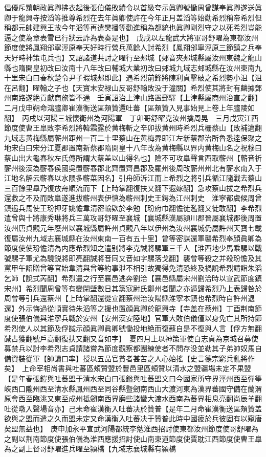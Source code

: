 倡優斥黷朝政眞卿拂衣起後張伯儀敗績令以首級夸示眞卿號慟周曾謀奉眞卿遂送眞卿于龍興寺按滔等推尊希烈在去年眞卿使許在今年正月盖滔等始勸希烈稱帝希烈但稱都元帥建興王故今年滔等再遣樊播等勸進稱為都統也眞卿剛烈守之以死希烈豈能逼之使為章表雪已行狀云詐為表奏是也】　戊戌以左龍武大將軍哥舒曜為東都汝州節度使將鳳翔邠寧涇原奉天好畤行營兵萬餘人討希烈【鳳翔邠寧涇原三節鎮之兵奉天好畤神策屯兵也】又詔諸道共討之曜行至郟城【郟音夾郟城縣屬汝州東魏之龍山縣也隋開皇初改曰汝南十八年改曰輔城大業初改曰郟城九域志郟城縣在汝州東南九十里宋白曰春秋楚令尹子瑕城郟即此】遇希烈前鋒將陳利貞擊破之希烈勢小沮【沮在呂翻】曜翰之子也【天寶末安禄山反哥舒翰敗没于潼關】希烈使其將封有麟據鄧州南路遂絶貢獻商旅皆不通　壬寅詔治上津山路置郵驛【上津縣屬商州治直之翻】　二月戊申朔命鴻臚卿崔漢衡送區頰贊還吐蕃【區頰贊入見事始見上卷上年臚陵如翻】　丙戌以河陽三城懷衛州為河陽軍　丁卯哥舒曜克汝州擒周晃　三月戊寅江西節度使曹王臯敗李希烈將韓霜露於黄梅斬之辛卯拔黄州時希烈兵栅蔡山【敗補邁翻九域志黄梅縣屬蘄州距州一百二十里蔡山在黄梅界即江左新蔡郡治所魯悉逹保聚之地宋白曰宋分江夏郡置南新蔡郡隋開皇十八年改為黄梅縣以界内黄梅山名之祝穆曰蔡山出大龜春秋左氏傳所謂大蔡盖以山得名也】險不可攻臯聲言西取蘄州【蘄音祈蘄州後漢為蘄春侯國吳置蘄春郡北齊置齊昌郡及羅州後周改蘄州州北有蘄水南入于江地名解云蘄春以水隈多蘄菜因名】引舟師泝江而上希烈之將引兵循江隨戰去蔡山三百餘里臯乃復放舟順流而下【上時掌翻復扶又翻下遐嫁翻】急攻蔡山拔之希烈兵還救之不及而敗臯遂進拔蘄州表伊慎為蘄州刺史王鍔為江州刺史　淮寧都虞候周曾鎮遏兵馬使王玢押牙姚憺韋清密輸欵於李勉【玢府巾翻憺徒濫翻又徒敢翻】李希烈遣曾與十將康秀琳將兵三萬攻哥舒曜至襄城【襄城縣漢屬潁川郡晉屬襄城郡後周置汝州唐貞觀元年廢州以襄城縣屬許州貞觀八年以伊州為汝州襄城仍屬許州天寶七載復屬汝州九域志襄城縣在汝州東南一百有五十里】曾等密謀還軍襲希烈奉顔眞卿為節度使使玢憺清為内應希烈知之遣别將李克誠將騾軍三千人【淮西地少馬乘騾以戰號騾子軍尤為驍鋭將即亮翻誠將音同又音如字騾落戈翻】襲曾等殺之并殺玢憺及其黨甲午詔贈曾等官始韋清與曾等約事泄不相引故獨得免清恐終及禍說希烈請詣朱滔乞師【說式芮翻】希烈遣之行至襄邑逃奔劉洽【襄邑縣屬宋州劉洽時以宣武節度鎮宋州】希烈聞周曾等有變閉壁數日其黨寇尉氏鄭州者聞之亦遁歸希烈乃上表歸咎於周曾等引兵還蔡州【上時掌翻還從宣翻蔡州治汝陽縣淮寧本鎮也希烈時自許州退還】外示悔過從順實待朱滔等之援也置顔眞卿於龍興寺【寺盖在蔡州】丁酉荆南節度使張伯儀與淮寧兵戰於安州【安州漢安陸地】官軍大敗伯儀僅以身免亡其所持節希烈使人以其節及俘馘示顔眞卿眞卿號慟投地絶而復蘇自是不復與人言【俘方無翻馘古獲翻號戶高翻復扶又翻又音如字】　夏四月上以神策軍使白志貞為京城召募使募禁兵以討李希烈志貞請諸嘗為節度觀察都團練使者不問存没並勒其子弟帥奴馬自備資裝從軍【帥讀口率】授以五品官貧者甚苦之人心始搖【史言德宗窮兵亂將作矣】　上命宰相尚書與吐蕃區頰贊盟於豐邑里區頰贊以清水之盟疆場未定不果盟【是年春張鎧與吐蕃盟于清水宋白曰張鎰與吐蕃盟文曰今國家所守界涇州西至彈箏峽西口隴州西至清水縣鳳州西至同谷縣暨劒南西山大渡河東為漢界蕃國守備在蘭渭原會西至臨洮又東至成州抵劒南西界磨些諸蠻大渡水西南為蕃界相息亮翻尚辰羊翻吐從暾入聲場音亦】己未命崔漢衡入吐蕃决於贊普【是年二月命崔漢衡送區頰贊盖欲與之盟而遣之久而盟未定又命漢衡入吐蕃决于贊普此時中國疲於兵彼固有以窺唐矣盟無益也】　庚申加永平宣武河陽都統李勉淮西招討使東都汝州節度使哥舒曜為之副以荆南節度使張伯儀為淮西應援招討使山南東道節度使賈耽江西節度使曹王臯為之副上督哥舒曜進兵曜至潁橋【九域志襄城縣有潁橋